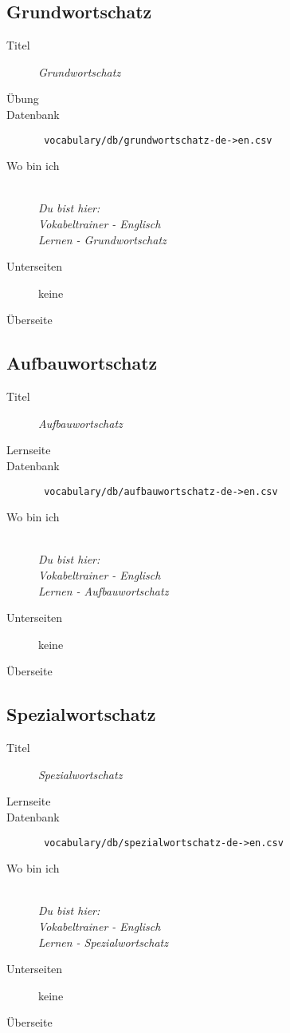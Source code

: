 \subsection{ Grundwortschatz }
\label{has:voc-learn-page1}
\begin{description}
	\item[Titel] \emph{ Grundwortschatz }
	\item[Übung] 
	\item[Datenbank] \texttt{ vocabulary/db/grundwortschatz-de->en.csv }
	\item[Wo bin ich] \emph{\\Du bist hier:\\Vokabeltrainer - Englisch\\Lernen - Grundwortschatz}
	\item[Unterseiten] keine
	\item[Überseite] 
\end{description}

\subsection{ Aufbauwortschatz }
\label{has:voc-learn-page2}
\begin{description}
	\item[Titel] \emph{ Aufbauwortschatz }
	\item[Lernseite] 
	\item[Datenbank] \texttt{ vocabulary/db/aufbauwortschatz-de->en.csv }
	\item[Wo bin ich] \emph{\\Du bist hier:\\Vokabeltrainer - Englisch\\Lernen - Aufbauwortschatz}
	\item[Unterseiten] keine
	\item[Überseite] 
\end{description}

\subsection{ Spezialwortschatz }
\label{has:voc-learn-page3}
\begin{description}
	\item[Titel] \emph{ Spezialwortschatz }
	\item[Lernseite] 
	\item[Datenbank] \texttt{ vocabulary/db/spezialwortschatz-de->en.csv }
	\item[Wo bin ich] \emph{\\Du bist hier:\\Vokabeltrainer - Englisch\\Lernen - Spezialwortschatz}
	\item[Unterseiten] keine
	\item[Überseite] 
\end{description}

